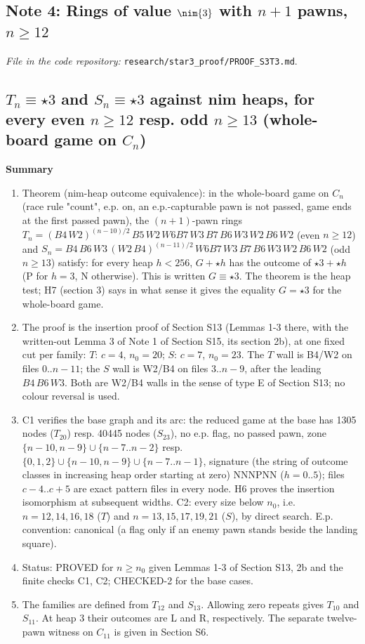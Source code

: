 \subsection{Note 4: Rings of value $\nim{3}$ with $n+1$ pawns, $n\ge12$}

\noindent\emph{File in the code repository:} \texttt{research/star3\_proof/PROOF\_S3T3.md}.\par


\subsection*{$T_n\equiv\star3$ and $S_n\equiv\star3$ against nim heaps, for every even $n\ge12$ resp. odd $n\ge13$ (whole-board game on $C_n$)}
\textbf{Summary}

\begin{enumerate}
\item Theorem (nim-heap outcome equivalence): in the whole-board game on $C_n$ (race rule "count", e.p. on, an e.p.-capturable pawn is not passed, game ends at the first passed pawn), the $(n+1)$-pawn rings $T_n = (B4\,W2)^{(n-10)/2}\,B5\,W2\,W6B7\,W3\,B7\,B6\,W3\,W2\,B6\,W2$ (even $n\ge12$) and $S_n = B4\,B6\,W3\,(W2\,B4)^{(n-11)/2}\,W6B7\,W3\,B7\,B6\,W3\,W2\,B6\,W2$ (odd $n\ge13$) satisfy: for every heap $h<256$, $G+\star h$ has the outcome of $\star3+\star h$ (P for $h=3$, N otherwise). This is written $G\equiv\star3$. The theorem is the heap test; H7 (section 3) says in what sense it gives the equality $G=\star3$ for the whole-board game.
\item The proof is the insertion proof of Section S13 (Lemmas 1-3 there, with the written-out Lemma 3 of Note 1 of Section S15, its section 2b), at one fixed cut per family: $T$: $c=4$, $n_0=20$; $S$: $c=7$, $n_0=23$. The $T$ wall is B4/W2 on files $0..n-11$; the $S$ wall is W2/B4 on files $3..n-9$, after the leading $B4\,B6\,W3$. Both are W2/B4 walls in the sense of type E of Section S13; no colour reversal is used.
\item C1 verifies the base graph and its arc: the reduced game at the base has 1305 nodes ($T_{20}$) resp. 40445 nodes ($S_{23}$), no e.p. flag, no passed pawn, zone $\{n-10,n-9\}\cup\{n-7..n-2\}$ resp. $\{0,1,2\}\cup\{n-10,n-9\}\cup\{n-7..n-1\}$, signature (the string of outcome classes in increasing heap order starting at zero) NNNPNN ($h=0..5$); files $c-4..c+5$ are exact pattern files in every node. H6 proves the insertion isomorphism at subsequent widths. C2: every size below $n_0$, i.e. $n=12,14,16,18$ ($T$) and $n=13,15,17,19,21$ ($S$), by direct search. E.p. convention: canonical (a flag only if an enemy pawn stands beside the landing square).
\item Status: PROVED for $n\ge n_0$ given Lemmas 1-3 of Section S13, 2b and the finite checks C1, C2; CHECKED-2 for the base cases.
\item The families are defined from $T_{12}$ and $S_{13}$. Allowing zero repeats gives $T_{10}$ and $S_{11}$. At heap 3 their outcomes are L and R, respectively. The separate twelve-pawn witness on $C_{11}$ is given in Section S6.
\end{enumerate}
